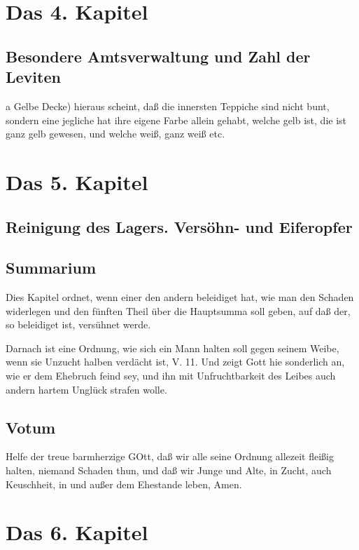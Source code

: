 \chapter{Das 4. Kapitel}

\section{Besondere Amtsverwaltung und Zahl der Leviten}

a Gelbe Decke) hieraus scheint, daß die innersten Teppiche sind nicht bunt, sondern eine jegliche hat ihre eigene Farbe allein gehabt, welche gelb ist, die ist ganz gelb gewesen, und welche weiß, ganz weiß etc.

\chapter{Das 5. Kapitel}

\section{Reinigung des Lagers. Versöhn- und Eiferopfer}

\section{Summarium}

Dies Kapitel ordnet, wenn einer den andern beleidiget hat, wie man den Schaden widerlegen und den fünften Theil über die Hauptsumma soll geben, auf daß der, so beleidiget ist, versühnet werde.

Darnach ist eine Ordnung, wie sich ein Mann halten soll gegen seinem Weibe, wenn sie Unzucht halben verdächt ist, V. 11. Und zeigt Gott hie sonderlich an, wie er dem Ehebruch feind sey, und ihn mit Unfruchtbarkeit des Leibes auch andern hartem Unglück strafen wolle.

\section{Votum}

Helfe der treue barmherzige GOtt, daß wir alle seine Ordnung allezeit fleißig halten, niemand Schaden thun, und daß wir Junge und Alte, in Zucht, auch Keuschheit, in und außer dem Ehestande leben, Amen.

\chapter{Das 6. Kapitel}

